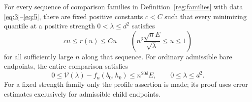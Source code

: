 \begin{proposition}\label{reg:finite-propagation}
For every sequence of comparison families in Definition~\ref{reg:families}
with data \eqref{eq:3}--\eqref{eq:5}, there are fixed positive
constants $c<C$ such that every minimizing quantile at a positive
strength $0<\lambda\le d^2$ satisfies
\[
 cu\le r(u)\le Cu\qquad
 \left(n^\delta\frac{\sqrt n E}{\sqrt\lambda}\le u\le1\right)
\]
for all sufficiently large $n$ along that sequence.  For ordinary admissible bare
endpoints, the entire comparison satisfies
\[
 0\le\mathcal V(\lambda)-f_n(b_0,h_0)
                  \le n^{20\delta}E,
       \qquad 0\le\lambda\le d^2.
\]
For a fixed strength family only the profile assertion is made;
its proof uses error estimates exclusively for admissible child
endpoints.
\end{proposition}

